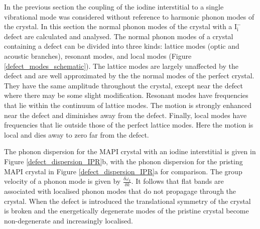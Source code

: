 In the previous section the coupling of the iodine interstitial to a single vibrational mode was considered without reference to harmonic phonon modes of the crystal.
In this section the normal phonon modes of the crystal with a $\mathrm{I}_\mathrm{i}^-$ defect are calculated and analysed.
The normal phonon modes of a crystal containing a defect can be divided into three kinds: lattice modes (optic and acoustic branches), resonant modes, and local modes (Figure \ref{defect_modes_schematic}).\autocite{Stoneham defect defect processes}
The lattice modes are largely unaffected by the defect and are well approximated by the the normal modes of the perfect crystal. They have the same amplitude throughout the crystal, except near the defect where there may be some slight modification. 
Resonant modes have frequencies that lie within the continuum of lattice modes. The motion is strongly enhanced near the defect and diminishes away from the defect.
Finally, local modes have frequencies that lie outside those of the perfect lattice modes. Here the motion is local and dies away to zero far from the defect.

The phonon dispersion for the MAPI crystal with an iodine interstitial is given in Figure \ref{defect_dispersion_IPR}b, with the phonon dispersion for the pristing MAPI crystal in Figure \ref{defect_dispersion_IPR}a for comparison.
The group velocity of a phonon mode is given by $\frac{\delta \omega_k}{\delta k}$. It follows that flat bands are associated with localised phonon modes that do not propagage through the crystal. 
When the defect is introduced the translational symmetry of the crystal is broken and the energetically degenerate modes of the pristine crystal become non-degenerate and increasingly localised.

